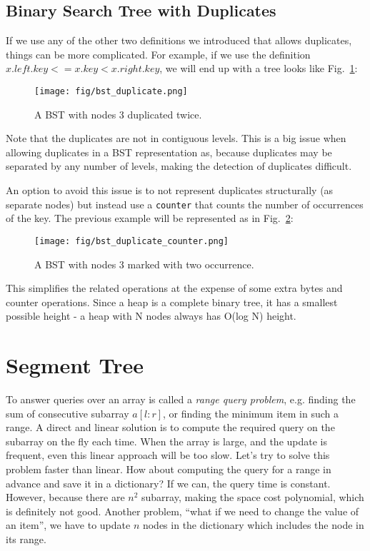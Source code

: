 \documentclass[main.tex]{subfiles}
\begin{document}
\subsection{Binary Search Tree with Duplicates}
If we use any of the other two definitions we introduced that allows duplicates, things can be more complicated. For example, if we  use the definition $x.left.key <= x.key < x.right.key$, we will end up with a tree looks like Fig.~\ref{fig:bst_duplicate}: 
\begin{figure}[H]
    \centering
    \texttt{[image: fig/bst\_duplicate.png]}
    \caption{A BST with nodes 3 duplicated twice.}
    \label{fig:bst_duplicate}
\end{figure}
Note that the duplicates are not in contiguous levels. This is a big issue when allowing duplicates in a BST representation as, because  duplicates may be separated by any number of levels, making the detection of duplicates difficult.

An option to avoid this issue is to not represent duplicates structurally (as separate nodes) but instead use a \texttt{counter} that counts the number of occurrences of the key. The previous example will be represented as in Fig.~\ref{fig:bst_duplicate_counter}:
\begin{figure}[H]
    \centering
    \texttt{[image: fig/bst\_duplicate\_counter.png]}
    \caption{A BST with nodes 3 marked with two occurrence.}
    \label{fig:bst_duplicate_counter}
\end{figure}

This simplifies the related operations at the expense of some extra bytes and counter operations. Since a heap is a complete binary tree, it has a smallest possible height - a heap with N nodes always has O(log N) height. 



\section{Segment Tree}
\label{sec_segment_tree}
To answer queries over an array is called a \textit{range query problem}, e.g. finding the sum of consecutive subarray $a[l:r]$, or finding the minimum item in such a range. A direct and linear solution is to compute the required query on the subarray on the fly each time. When the array is large, and the update is frequent, even this linear approach will be too slow. Let's try to solve this problem faster than linear. How about computing the query for a range in advance and save it in a dictionary? If we can, the query time is constant. However, because there are $n^2$ subarray, making the space cost polynomial, which is definitely not good.  Another problem, ``what if we need to change the value of an item'', we have to update $n$ nodes in the dictionary which includes the node in its range. 
\end{document}
